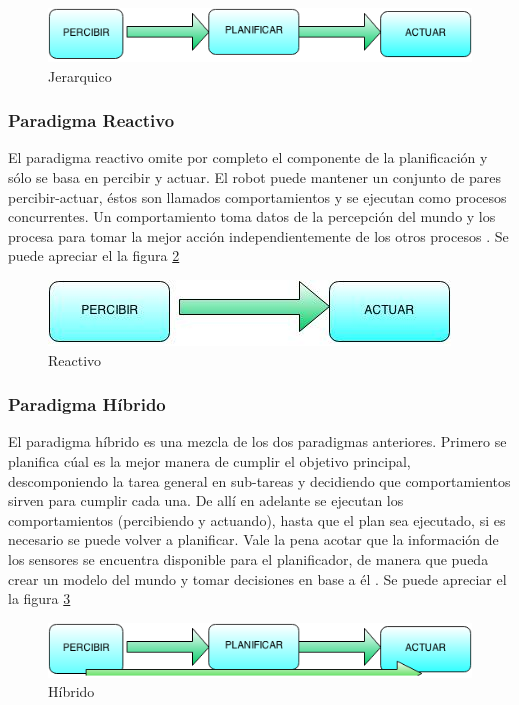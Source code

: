 \begin{figure}[hbtp]

\centering
\includegraphics[scale=0.7]{imagenes/jerarquico.png} 
\caption{Jerarquico}
\label{fig:jerarquico}
\end{figure}


\subsubsection{Paradigma Reactivo}
El paradigma reactivo omite por completo el componente de la planificación y s\'olo se basa en percibir y actuar. El robot puede mantener un conjunto de pares percibir-actuar, \'estos son llamados comportamientos y se ejecutan como procesos concurrentes. Un comportamiento toma datos de la percepción del mundo y los procesa para tomar la mejor acción independientemente de los otros procesos \cite{AiRobotics}.
Se puede apreciar el la figura \ref{fig:reactivo}
\begin{figure}[hbtp]

\centering
\includegraphics[scale=0.7]{imagenes/reactivo.jpg} 
\caption{Reactivo}
\label{fig:reactivo}
\end{figure}


\subsubsection{Paradigma Híbrido}
El paradigma híbrido es una mezcla de los dos paradigmas anteriores. Primero se planifica cúal es la mejor manera de cumplir el objetivo principal, descomponiendo la tarea general en sub-tareas y decidiendo que comportamientos sirven para cumplir cada una. De allí en adelante se ejecutan los comportamientos (percibiendo y actuando), hasta que el plan sea ejecutado, si es necesario se puede volver a planificar. Vale la pena acotar que la información de los sensores se encuentra disponible para el planificador, de manera que pueda crear un modelo del mundo y tomar decisiones en base a él  \cite{AiRobotics}. 
Se puede apreciar el la figura \ref{fig:hibrido}
\begin{figure}[hbtp]

\centering
\includegraphics[scale=0.7]{imagenes/hibrido.png} 
\caption{H\'ibrido}
\label{fig:hibrido}
\end{figure}
